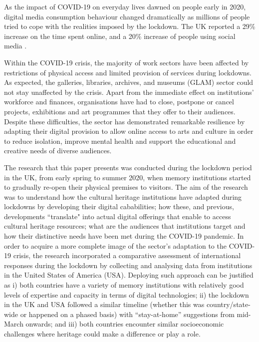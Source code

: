 \documentclass{egpubl}
\begin{document}
As the impact of COVID-19 on everyday lives dawned on people early in 2020, digital media consumption behaviour changed dramatically as millions of people tried to cope with the realities imposed by the lockdown. The UK reported a 29\% increase on the time spent online, and a 20\% increase of people using social media \cite{ofcom:2020}. 

Within the COVID-19 crisis, the majority of work sectors have been affected by restrictions of physical access and limited provision of services during lockdowns. As expected, the galleries, libraries, archives, and museums (GLAM) sector could not stay unaffected by the crisis. Apart from the immediate effect on institutions' workforce and finances, organisations have had to close, postpone or cancel projects, exhibitions and art programmes that they offer to their audiences. Despite these difficulties, the sector has demonstrated remarkable resilience by adapting their digital provision to allow online access to arts and culture in order to reduce isolation, improve mental health and support the educational and creative needs of diverse audiences.

The research that this paper presents was conducted during the lockdown period in the UK, from early spring to summer 2020, when memory institutions started to gradually re-open their physical premises to visitors. The aim of the research was to understand how the cultural heritage institutions have adapted during lockdowns by developing their digital cababilities; how these, and previous, developments ``translate" into actual digital offerings that enable to access cultural heritage resources; what are the audiences that institutions target and how their distinctive needs have been met during the COVID-19 pandemic. In order to acquire a more complete image of the sector's adaptation to the COVID-19 crisis, the research incorporated a comparative assessment of international responses during the lockdown by collecting and analysing data from institutions in the United States of America (USA). Deploying such approach can be justified as i) both countries have a variety of memory institutions with relatively good levels of expertise and capacity in terms of digital technologies; ii) the lockdown in the UK and USA followed a similar timeline (whether this was country/state-wide or happened on a phased basis) with ``stay-at-home'' suggestions from mid-March onwards; and iii) both countries encounter similar socioeconomic challenges where heritage could make a difference or play a role.
\end{document}
